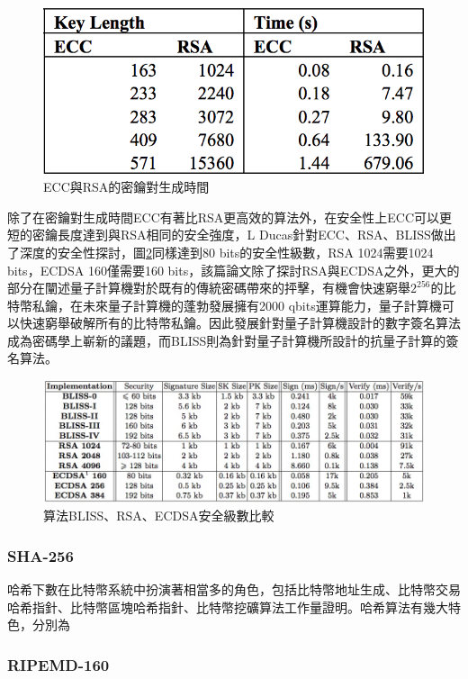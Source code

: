 			\begin{figure}[h]
				\centering
				\includegraphics[width = .5\textwidth]{ECCtime.png}
				\caption{ECC與RSA的密鑰對生成時間\supercite{Performancecomparisonofellipticcurveandrsadigitalsignatures}}\label{ECCtime}
			\end{figure}

			除了在密鑰對生成時間ECC有著比RSA更高效的算法外，在安全性上ECC可以更短的密鑰長度達到與RSA相同的安全強度，L Ducas針對ECC、RSA、BLISS做出了深度的安全性探討\supercite{LatticesignaturesandbimodalGaussians}，圖\ref{LatticesignaturesandbimodalGaussians}同樣達到80 bits的安全性級數，RSA 1024需要1024 bits，ECDSA 160僅需要160 bits，該篇論文除了探討RSA與ECDSA之外，更大的部分在闡述量子計算機對於既有的傳統密碼帶來的抨擊，有機會快速窮舉$2^{256}$的比特幣私鑰，在未來量子計算機的蓬勃發展擁有2000 qbits運算能力，量子計算機可以快速窮舉破解所有的比特幣私鑰。因此發展針對量子計算機設計的數字簽名算法成為密碼學上嶄新的議題，而BLISS則為針對量子計算機所設計的抗量子計算的簽名算法。

			\begin{figure}[h]
				\centering
				\includegraphics[width = 1\textwidth]{LatticesignaturesandbimodalGaussians.png}
				\caption{算法BLISS、RSA、ECDSA安全級數比較\supercite{LatticesignaturesandbimodalGaussians}}\label{LatticesignaturesandbimodalGaussians}
			\end{figure}

			\subsubsection{SHA-256}
			哈希下數在比特幣系統中扮演著相當多的角色，包括比特幣地址生成、比特幣交易哈希指針、比特幣區塊哈希指針、比特幣挖礦算法工作量證明。哈希算法有幾大特色，分別為
			\subsubsection{RIPEMD-160}
